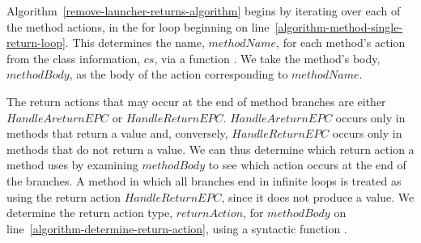 \begin{algorithm}[ht]
\begin{algorithmic}[1]
    \label{algorithm-copy-ExecuteMethod-in-Started}
    \State {}
    \label{algorithm-ExecuteMethod-refinement-MainThread}
    \State {}
    \label{algorithm-ExecuteMethod-refinement-Started}
    \State {}
    \label{algorithm-remove-ExecuteMethod}
  \State {}
    \label{algorithm-reintroduce-ExecuteMethod}
    \State {}
    \label{algorithm-copy-ExecuteMethod-out-MainThread}
    \State {}
    \label{algorithm-copy-ExecuteMethod-out-Started}
  \end{algorithmic}
  \caption{}
  \label{remove-launcher-returns-algorithm}
\end{algorithm}
  
Algorithm~\ref{remove-launcher-returns-algorithm} begins by iterating
over each of the method actions, in the for loop beginning on
line~\ref{algorithm-method-single-return-loop}.
This determines the name, $methodName$, for each method's action from
the class information, $cs$, via a function
.
We take the method's body, $methodBody$, as the body of the action
corresponding to $methodName$.

The return actions that may occur at the end of method branches are
either $HandleAreturnEPC$ or $HandleReturnEPC$.
$HandleAreturnEPC$ occurs only in methods that return a value and,
conversely, $HandleReturnEPC$ occurs only in methods that do not
return a value.
We can thus determine which return action a method uses by examining
$methodBody$ to see which action occurs at the end of the branches.
A method in which all branches end in infinite loops is treated as
using the return action $HandleReturnEPC$, since it does not produce a
value.
We determine the return action type, $returnAction$, for $methodBody$
on line~\ref{algorithm-determine-return-action}, using a syntactic
function .

